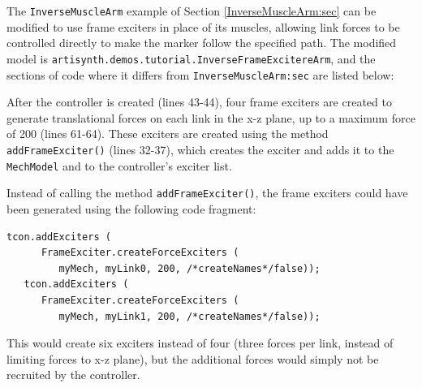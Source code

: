 The {\tt InverseMuscleArm} example of Section
\ref{InverseMuscleArm:sec} can be modified to use
frame exciters in place of its muscles, allowing link forces
to be controlled directly to make the marker follow
the specified path. The modified model is
{\tt artisynth.demos.tutorial.InverseFrameExcitereArm},
and the sections of code where it differs
from {\tt InverseMuscleArm:sec} are listed below:
%
\lstset{numbers=left}
\iflatexml

\else
{}

\fi
\lstset{numbers=none}
%
%
\lstset{numbers=left}
\iflatexml

\else
{}

\fi
\lstset{numbers=none}
%
After the controller is created (lines 43-44), four frame exciters are created
to generate translational forces on each link in the x-z plane, up to a maximum
force of 200 (lines 61-64). These exciters are created using the method {\tt
addFrameExciter()} (lines 32-37), which creates the exciter and adds it to the
{\tt MechModel} and to the controller's exciter list.

\iflatexml\else\clearpage\fi

Instead of calling the method {\tt addFrameExciter()}, the frame exciters could have been generated using the following code fragment:
%
\begin{lstlisting}[]
   tcon.addExciters (
      FrameExciter.createForceExciters (
         myMech, myLink0, 200, /*createNames*/false));
   tcon.addExciters (
      FrameExciter.createForceExciters (
         myMech, myLink1, 200, /*createNames*/false));
\end{lstlisting}
%
This would create six exciters instead of four (three forces per link, instead
of limiting forces to x-z plane), but the additional forces would simply not be
recruited by the controller.


